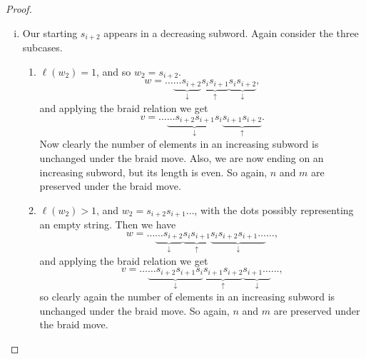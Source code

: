 \documentclass[10pt,a4paper]{amsart}
\begin{document}
\begin{proof}
\begin{enumerate}[(i)]
\begin{enumerate}
        \item $\ell(w_2)>1$, and $w_2=s_{i+2}s_{i+1}\hdots$, with the dots possibly representing an empty string. Then we have 
        \[w=\hdots\underbrace{\hdots s_{i+2}s_is_{i+1}}_\uparrow\underbrace{s_is_{i+2}s_{i+1}\hdots}_\downarrow\hdots,\]
        and, applying the braid relation, we get
        \[v=\hdots\underbrace{\hdots s_{i+2}}_\uparrow\underbrace{s_{i+1}s_i}_\downarrow\underbrace{s_{i+1}s_{i+2}}_\uparrow\underbrace{s_{i+1}\hdots}_\downarrow\hdots,\]
        which preserves $u$ and whether the word ends in an odd increasing subword. 

        \item $\ell(w_2)>1$, and $w_2=s_{i+2}s_i\hdots$, with the dots possibly representing an empty string. Then we have 
        \[w=\hdots\underbrace{\hdots s_{i+2}s_is_{i+1}}_\uparrow\underbrace{s_is_{i+2}s_{i+1}}_\downarrow\underbrace{s_i\hdots}_\uparrow\hdots,\]
        and, applying the braid relation, we get
        \[v=\hdots\underbrace{\hdots s_{i+2}}_\uparrow\underbrace{s_{i+1}s_i}_\downarrow\underbrace{s_{i+1}s_{i+2}s_i\hdots}_\uparrow\hdots,\]
        which preserves $u$ and the parity of any end subword. 

    
        \end{enumerate}
        \item Our starting $s_{i+2}$ appears in a decreasing subword. Again consider the three subcases.
        \begin{enumerate}
            \item $\ell(w_2)=1$, and so $w_2=s_{i+2}$.
        \[w=\hdots\underbrace{\hdots s_{i+2}}_\downarrow\underbrace{s_is_{i+1}}_\uparrow\underbrace{s_is_{i+2}}_\downarrow,\]
        and applying the braid relation we get
        \[v=\hdots\underbrace{\hdots s_{i+2}s_{i+1}s_i}_\downarrow\underbrace{s_{i+1}s_{i+2}}_\uparrow.\]
        Now clearly the number of elements in an increasing subword is unchanged under the braid move. Also, we are now ending on an increasing subword, but its length is even. So again, $n$ and $m$ are preserved under the braid move. 

         \item $\ell(w_2)>1$, and $w_2=s_{i+2}s_{i+1}\hdots$, with the dots possibly representing an empty string. Then we have 
        \[w=\hdots\underbrace{\hdots s_{i+2}}_\downarrow\underbrace{s_is_{i+1}}_\uparrow\underbrace{s_is_{i+2}s_{i+1}\hdots}_\downarrow\hdots,\]
        and applying the braid relation we get
        \[v=\hdots\underbrace{\hdots s_{i+2}s_{i+1}s_i}_\downarrow\underbrace{s_{i+1}s_{i+2}}_\uparrow\underbrace{s_{i+1}\hdots}_\downarrow\hdots,\]
        so clearly again the number of elements in an increasing subword is unchanged under the braid move. So again, $n$ and $m$ are preserved under the braid move. 



\end{enumerate}
\end{enumerate}
\end{proof}
\end{document}
